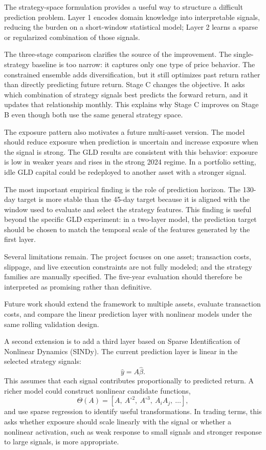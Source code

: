 \documentclass[11pt, letterpaper]{article}
\begin{document}
The strategy-space formulation provides a useful way to structure a difficult prediction problem. Layer 1 encodes domain knowledge into interpretable signals, reducing the burden on a short-window statistical model; Layer 2 learns a sparse or regularized combination of those signals.

The three-stage comparison clarifies the source of the improvement. The single-strategy baseline is too narrow: it captures only one type of price behavior. The constrained ensemble adds diversification, but it still optimizes past return rather than directly predicting future return. Stage C changes the objective. It asks which combination of strategy signals best predicts the forward return, and it updates that relationship monthly. This explains why Stage C improves on Stage B even though both use the same general strategy space.

The exposure pattern also motivates a future multi-asset version. The model should reduce exposure when prediction is uncertain and increase exposure when the signal is strong. The GLD results are consistent with this behavior: exposure is low in weaker years and rises in the strong 2024 regime. In a portfolio setting, idle GLD capital could be redeployed to another asset with a stronger signal.

The most important empirical finding is the role of prediction horizon. The 130-day target is more stable than the 45-day target because it is aligned with the window used to evaluate and select the strategy features. This finding is useful beyond the specific GLD experiment: in a two-layer model, the prediction target should be chosen to match the temporal scale of the features generated by the first layer.

Several limitations remain. The project focuses on one asset; transaction costs, slippage, and live execution constraints are not fully modeled; and the strategy families are manually specified. The five-year evaluation should therefore be interpreted as promising rather than definitive.

Future work should extend the framework to multiple assets, evaluate transaction costs, and compare the linear prediction layer with nonlinear models under the same rolling validation design.

A second extension is to add a third layer based on Sparse Identification of Nonlinear Dynamics (SINDy). The current prediction layer is linear in the selected strategy signals:
\[
    \hat{y}=A\hat{\beta}.
\]
This assumes that each signal contributes proportionally to predicted return. A richer model could construct nonlinear candidate functions,
\[
    \Theta(A)
    =
    [A,\ A^{\circ 2},\ A^{\circ 3},\ A_iA_j,\ \ldots],
\]
and use sparse regression to identify useful transformations. In trading terms, this asks whether exposure should scale linearly with the signal or whether a nonlinear activation, such as weak response to small signals and stronger response to large signals, is more appropriate.
\end{document}
